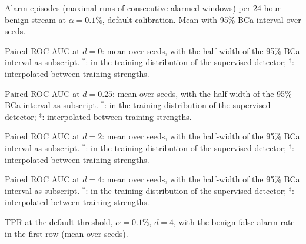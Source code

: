 \documentclass[11pt,a4paper]{article}
\begin{document}
\begin{table}[h]
\centering
\caption{Alarm episodes (maximal runs of consecutive alarmed windows) per 24-hour benign stream at $\alpha=0.1\%$, default calibration. Mean with 95\% BCa interval over \nSeeds{} seeds.}\label{tab:episodes}
\footnotesize\resizebox{\linewidth}{!}{}
\end{table}

\begin{table}[h]
\centering
\caption{Paired ROC AUC at $d=0$: mean over \nSeeds{} seeds, with the half-width of the 95\% BCa interval as subscript. $^*$: in the training distribution of the supervised detector; $^\ddagger$: interpolated between training strengths.}\label{tab:aucd0}
\scriptsize\setlength{\tabcolsep}{2pt}\resizebox{\linewidth}{!}{}
\end{table}

\begin{table}[h]
\centering
\caption{Paired ROC AUC at $d=0.25$: mean over \nSeeds{} seeds, with the half-width of the 95\% BCa interval as subscript. $^*$: in the training distribution of the supervised detector; $^\ddagger$: interpolated between training strengths.}\label{tab:aucdq}
\scriptsize\setlength{\tabcolsep}{2pt}\resizebox{\linewidth}{!}{}
\end{table}

\begin{table}[h]
\centering
\caption{Paired ROC AUC at $d=2$: mean over \nSeeds{} seeds, with the half-width of the 95\% BCa interval as subscript. $^*$: in the training distribution of the supervised detector; $^\ddagger$: interpolated between training strengths.}\label{tab:aucd2}
\scriptsize\setlength{\tabcolsep}{2pt}\resizebox{\linewidth}{!}{}
\end{table}

\begin{table}[h]
\centering
\caption{Paired ROC AUC at $d=4$: mean over \nSeeds{} seeds, with the half-width of the 95\% BCa interval as subscript. $^*$: in the training distribution of the supervised detector; $^\ddagger$: interpolated between training strengths.}\label{tab:aucd4}
\scriptsize\setlength{\tabcolsep}{2pt}\resizebox{\linewidth}{!}{}
\end{table}

\begin{table}[h]
\centering
\caption{TPR at the default threshold, $\alpha=0.1\%$, $d=4$, with the benign false-alarm rate in the first row (mean over \nSeeds{} seeds).}\label{tab:tprd4}
\scriptsize\setlength{\tabcolsep}{2pt}\resizebox{\linewidth}{!}{}
\end{table}
\end{document}
